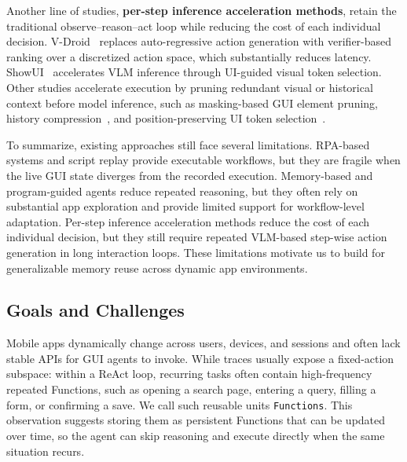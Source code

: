 
Another line of studies, \textbf{per-step inference acceleration methods}, retain the traditional observe--reason--act loop while reducing the cost of each individual decision.
V-Droid~\cite{dai2025advancing} replaces auto-regressive action generation with verifier-based ranking over a discretized action space, which substantially reduces latency.
ShowUI~\cite{lin2025showui} accelerates VLM inference through UI-guided visual token selection.
Other studies accelerate execution by pruning redundant visual or historical context before model inference, such as masking-based GUI element pruning, history compression~\cite{chen2025less}, and position-preserving UI token selection~\cite{ouyang2026focusui}.

To summarize, existing approaches still face several limitations.
RPA-based systems and script replay provide executable workflows, but they are fragile when the live GUI state diverges from the recorded execution.
Memory-based and program-guided agents reduce repeated reasoning, but they often rely on substantial app exploration and provide limited support for workflow-level adaptation.
Per-step inference acceleration methods reduce the cost of each individual decision, but they still require repeated VLM-based step-wise action generation in long interaction loops.
These limitations motivate us to build \sysname for generalizable memory reuse across dynamic app environments.

\subsection{Goals and Challenges}
\label{sec:obs3}
\label{sec:obs-need}

Mobile apps dynamically change across users, devices, and sessions and often lack stable APIs for GUI agents to invoke. While traces usually expose a fixed-action subspace:
within a ReAct loop, recurring tasks often contain high-frequency repeated
Functions, such as opening a search page, entering a query, filling a form, or
confirming a save.  We call such reusable units \texttt{Functions}.  This
observation suggests storing them as persistent Functions that can be updated over
time, so the agent can skip reasoning and execute directly when the same
situation recurs.

